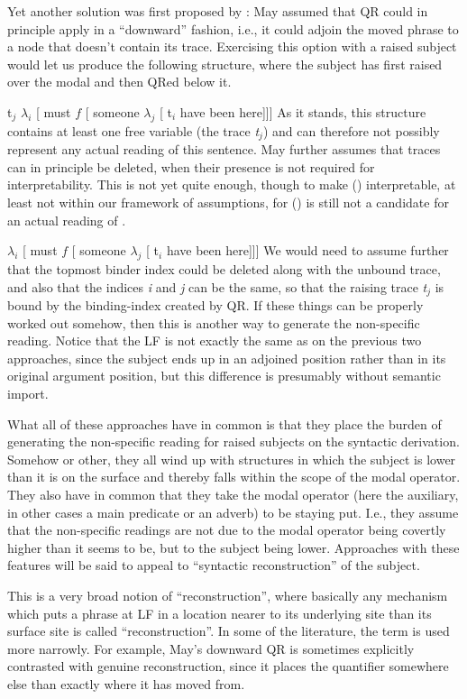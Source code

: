 Yet another solution was first proposed by \citet{may-1977-thesis}: May assumed
that QR could in principle apply in a ``downward'' fashion, i.e., it could
adjoin the moved phrase to a node that doesn't contain its trace. Exercising
this option with a raised subject would let us produce the following structure,
where the subject has first raised over the modal and then QRed below it.

\ex t$_j$ $\lambda_i$ [ must $f$ [ someone $\lambda_j$ [ t$_i$ have been here]]]
\xe
%
As it stands, this structure contains at least one free variable (the trace
\emph{t}$_j$) and can therefore not possibly represent any actual reading of
this sentence. May further assumes that traces can in principle be deleted, when
their presence is not required for interpretability. This is not yet quite
enough, though to make (\lastx) interpretable, at least not within our framework
of assumptions, for (\nextx) is still not a candidate for an actual reading of
.

\ex $\lambda_i$ [ must $f$ [ someone $\lambda_j$ [ t$_i$ have been here]]] \xe
%
We would need to assume further that the topmost binder index could be deleted
along with the unbound trace, and also that the indices \emph{i} and \emph{j}
can be the same, so that the raising trace \emph{t}$_j$ is bound by the
binding-index created by QR. If these things can be properly worked out somehow,
then this is another way to generate the non-specific reading. Notice that the
LF is not exactly the same as on the previous two approaches, since the subject
ends up in an adjoined position rather than in its original argument position,
but this difference is presumably without semantic import.

What all of these approaches have in common is that they place the burden of
generating the non-specific reading for raised subjects on the syntactic
derivation. Somehow or other, they all wind up with structures in which the
subject is lower than it is on the surface and thereby falls within the scope of
the modal operator. They also have in common that they take the modal operator
(here the auxiliary, in other cases a main predicate or an adverb) to be staying
put. I.e., they assume that the non-specific readings are not due to the modal
operator being covertly higher than it seems to be, but to the subject being
lower. Approaches with these features will be said to appeal to ``syntactic
reconstruction'' of the subject.

This is a very broad notion of ``reconstruction'', where basically any mechanism
which puts a phrase at LF in a location nearer to its underlying site than its
surface site is called ``reconstruction''. In some of the literature, the term
is used more narrowly. For example, May's downward QR is sometimes explicitly
contrasted with genuine reconstruction, since it places the quantifier somewhere
else than exactly where it has moved from.

